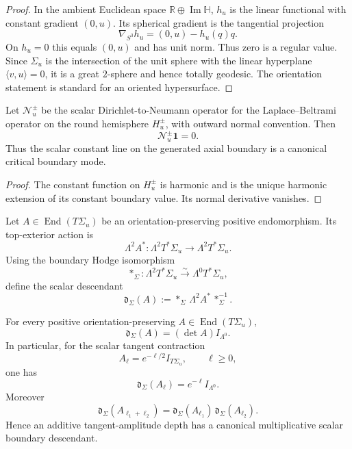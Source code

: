 \documentclass[11pt]{article}
\begin{document}
\begin{proof}
In the ambient Euclidean space $\mathbb R\oplus\operatorname{Im}\mathbb H$,
$h_u$ is the linear functional with constant gradient $(0,u)$.  Its spherical
gradient is the tangential projection
\[
 \nabla_{S^3}h_u=(0,u)-h_u(q)q.
\]
On $h_u=0$ this equals $(0,u)$ and has unit norm.  Thus zero is a regular
value.  Since $\Sigma_u$ is the intersection of the unit sphere with the
linear hyperplane $\langle v,u\rangle=0$, it is a great $2$-sphere and hence
totally geodesic.  The orientation statement is standard for an oriented
hypersurface.
\end{proof}

\begin{theorem}
\label{p1:thm:v557-axial-hemisphere-dtn-zero}
Let $\mathcal N_u^\pm$ be the scalar Dirichlet-to-Neumann operator for the
Laplace--Beltrami operator on the round hemisphere $H_u^\pm$, with outward
normal convention.  Then
\[
 \boxed{\mathcal N_u^\pm\mathbf1=0.}
\]
Thus the scalar constant line on the generated axial boundary is a canonical
critical boundary mode.
\end{theorem}

\begin{proof}
The constant function on $H_u^\pm$ is harmonic and is the unique harmonic
extension of its constant boundary value.  Its normal derivative vanishes.
\end{proof}

\begin{definition}
\label{p1:def:v557-boundary-determinant-scalarization}
\leavevmode\par
Let $A\in\operatorname{End}(T\Sigma_u)$ be an orientation-preserving positive
endomorphism.  Its top-exterior action is
\[
 \Lambda^2A^*:\Lambda^2T^*\Sigma_u\longrightarrow\Lambda^2T^*\Sigma_u.
\]
Using the boundary Hodge isomorphism
\[
 *_\Sigma:\Lambda^2T^*\Sigma_u\stackrel{\sim}{\longrightarrow}
 \Lambda^0T^*\Sigma_u,
\]
define the scalar descendant
\[
 \mathfrak d_\Sigma(A)
 :=*_\Sigma\,\Lambda^2A^*\,*_\Sigma^{-1}.
\]
\end{definition}

\begin{theorem}
\label{p1:thm:v557-determinant-scalar-descent}
For every positive orientation-preserving $A\in\operatorname{End}(T\Sigma_u)$,
\[
 \boxed{\mathfrak d_\Sigma(A)=(\det A)I_{\Lambda^0}.}
\]
In particular, for the scalar tangent contraction
\[
 A_\ell=e^{-\ell/2}I_{T\Sigma_u},\qquad \ell\ge0,
\]
one has
\[
 \boxed{\mathfrak d_\Sigma(A_\ell)=e^{-\ell}I_{\Lambda^0}.}
\]
Moreover
\[
 \mathfrak d_\Sigma(A_{\ell_1+\ell_2})
 =\mathfrak d_\Sigma(A_{\ell_1})\,
  \mathfrak d_\Sigma(A_{\ell_2}).
\]
Hence an additive tangent-amplitude depth has a canonical multiplicative
scalar boundary descendant.
\end{theorem}
\end{document}
